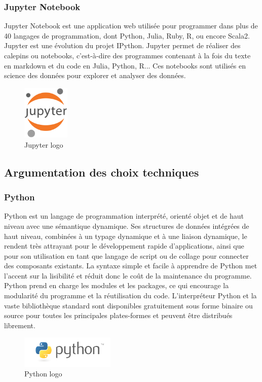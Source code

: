 \subsubsection*{Jupyter Notebook }
Jupyter Notebook est une application web utilisée pour programmer dans plus de 40 langages de programmation, dont Python, Julia, Ruby, R, ou encore Scala2. Jupyter est une évolution du projet IPython. Jupyter permet de réaliser des calepins ou notebooks, c'est-à-dire des programmes contenant à la fois du texte en markdown et du code en Julia, Python, R... Ces notebooks sont utilisés en science des données pour explorer et analyser des données.
\begin{figure}[!ht]\centering
\includegraphics[width=0.2\textwidth]{chapitres/chapitre7/figures/Jupyter.png}
\caption{Jupyter logo}
\label{fig:Jupyter}
\end{figure}
\subsection{Argumentation des choix techniques}
\subsubsection*{Python}
Python est un langage de programmation interprété, orienté objet et de haut niveau avec une sémantique dynamique. Ses structures de données intégrées de haut niveau, combinées à un typage dynamique et à une liaison dynamique, le rendent très attrayant pour le développement rapide d'applications, ainsi que pour son utilisation en tant que langage de script ou de collage pour connecter des composants existants. La syntaxe simple et facile à apprendre de Python met l'accent sur la lisibilité et réduit donc le coût de la maintenance du programme. Python prend en charge les modules et les packages, ce qui encourage la modularité du programme et la réutilisation du code. L'interpréteur Python et la vaste bibliothèque standard sont disponibles gratuitement sous forme binaire ou source pour toutes les principales plates-formes et peuvent être distribués librement.
\begin{figure}[!ht]\centering
\includegraphics[width=0.4\textwidth]{chapitres/chapitrex/figures/python.png}
\caption{Python logo }
\label{fig:python}
\end{figure}

